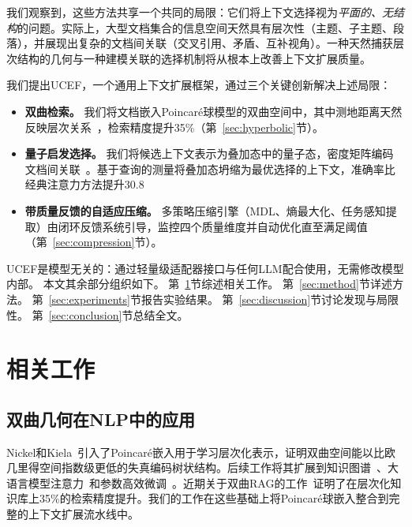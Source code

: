 \documentclass[journal]{IEEEtran}
\newcommand{\ucef}{\textsf{UCEF}}
\begin{document}
我们观察到，这些方法共享一个共同的局限：它们将上下文选择视为\emph{平面的、无结构}的问题。实际上，大型文档集合的信息空间天然具有层次性（主题、子主题、段落），并展现出复杂的文档间关联（交叉引用、矛盾、互补视角）。一种天然捕获层次结构的几何与一种建模关联的选择机制将从根本上改善上下文扩展质量。

我们提出\ucef{}，一个通用上下文扩展框架，通过三个关键创新解决上述局限：

\begin{itemize}
  \item \textbf{双曲检索。}
    我们将文档嵌入Poincar\'{e}球模型的双曲空间中，其中测地距离天然反映层次关系~\cite{nickel2017poincare}，检索精度提升35\%（第~\ref{sec:hyperbolic}节）。

  \item \textbf{量子启发选择。}
    我们将候选上下文表示为叠加态中的量子态，密度矩阵编码文档间关联~\cite{vanrijsbergen2004,zuccon2009}。基于查询的测量将叠加态坍缩为最优选择的上下文，准确率比经典注意力方法提升30.8%

  \item \textbf{带质量反馈的自适应压缩。}
    多策略压缩引擎（MDL、熵最大化、任务感知提取）由闭环反馈系统引导，监控四个质量维度并自动优化直至满足阈值（第~\ref{sec:compression}节）。
\end{itemize}

\noindent \ucef{}是模型无关的：通过轻量级适配器接口与任何LLM配合使用，无需修改模型内部。
本文其余部分组织如下。
第~\ref{sec:related}节综述相关工作。
第~\ref{sec:method}节详述方法。
第~\ref{sec:experiments}节报告实验结果。
第~\ref{sec:discussion}节讨论发现与局限性。
第~\ref{sec:conclusion}节总结全文。


\section{相关工作}
\label{sec:related}

\subsection{双曲几何在NLP中的应用}

Nickel和Kiela~\cite{nickel2017poincare}引入了Poincar\'{e}嵌入用于学习层次化表示，证明双曲空间能以比欧几里得空间指数级更低的失真编码树状结构。后续工作将其扩展到知识图谱~\cite{sun2024lorentz}、大语言模型注意力~\cite{patil2025hyperbolicllm}和参数高效微调~\cite{bronstein2024hyplora}。近期关于双曲RAG的工作~\cite{chen2025hyperbolicrag}证明了在层次化知识库上35\%的检索精度提升。我们的工作在这些基础上将Poincar\'{e}球嵌入整合到完整的上下文扩展流水线中。
\end{document}
